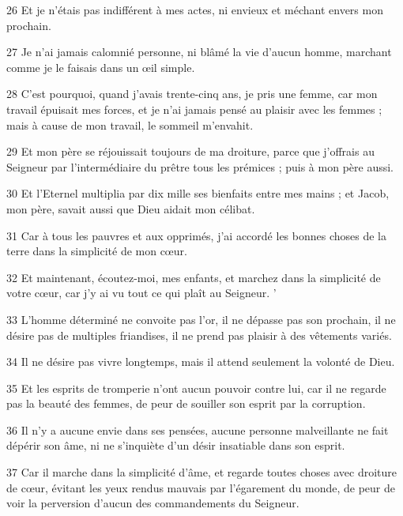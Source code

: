 \par 26 Et je n'étais pas indifférent à mes actes, ni envieux et méchant envers mon prochain.

\par 27 Je n'ai jamais calomnié personne, ni blâmé la vie d'aucun homme, marchant comme je le faisais dans un œil simple.

\par 28 C'est pourquoi, quand j'avais trente-cinq ans, je pris une femme, car mon travail épuisait mes forces, et je n'ai jamais pensé au plaisir avec les femmes ; mais à cause de mon travail, le sommeil m'envahit.

\par 29 Et mon père se réjouissait toujours de ma droiture, parce que j'offrais au Seigneur par l'intermédiaire du prêtre tous les prémices ; puis à mon père aussi.

\par 30 Et l'Eternel multiplia par dix mille ses bienfaits entre mes mains ; et Jacob, mon père, savait aussi que Dieu aidait mon célibat.

\par 31 Car à tous les pauvres et aux opprimés, j'ai accordé les bonnes choses de la terre dans la simplicité de mon cœur.

\par 32 Et maintenant, écoutez-moi, mes enfants, et marchez dans la simplicité de votre cœur, car j'y ai vu tout ce qui plaît au Seigneur. '

\par 33 L'homme déterminé ne convoite pas l'or, il ne dépasse pas son prochain, il ne désire pas de multiples friandises, il ne prend pas plaisir à des vêtements variés.

\par 34 Il ne désire pas vivre longtemps, mais il attend seulement la volonté de Dieu.

\par 35 Et les esprits de tromperie n'ont aucun pouvoir contre lui, car il ne regarde pas la beauté des femmes, de peur de souiller son esprit par la corruption.

\par 36 Il n'y a aucune envie dans ses pensées, aucune personne malveillante ne fait dépérir son âme, ni ne s'inquiète d'un désir insatiable dans son esprit.

\par 37 Car il marche dans la simplicité d'âme, et regarde toutes choses avec droiture de cœur, évitant les yeux rendus mauvais par l'égarement du monde, de peur de voir la perversion d'aucun des commandements du Seigneur.

